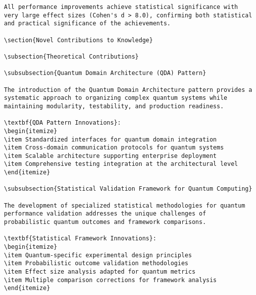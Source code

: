 \documentclass[12pt,a4paper]{report}
\begin{document}
\begin{lstlisting}
All performance improvements achieve statistical significance with very large effect sizes (Cohen's d > 8.0), confirming both statistical and practical significance of the achievements.

\section{Novel Contributions to Knowledge}

\subsection{Theoretical Contributions}

\subsubsection{Quantum Domain Architecture (QDA) Pattern}

The introduction of the Quantum Domain Architecture pattern provides a systematic approach to organizing complex quantum systems while maintaining modularity, testability, and production readiness.

\textbf{QDA Pattern Innovations}:
\begin{itemize}
\item Standardized interfaces for quantum domain integration
\item Cross-domain communication protocols for quantum systems
\item Scalable architecture supporting enterprise deployment
\item Comprehensive testing integration at the architectural level
\end{itemize}

\subsubsection{Statistical Validation Framework for Quantum Computing}

The development of specialized statistical methodologies for quantum performance validation addresses the unique challenges of probabilistic quantum outcomes and framework comparisons.

\textbf{Statistical Framework Innovations}:
\begin{itemize}
\item Quantum-specific experimental design principles
\item Probabilistic outcome validation methodologies
\item Effect size analysis adapted for quantum metrics
\item Multiple comparison corrections for framework analysis
\end{itemize}


\end{lstlisting}
\end{document}
